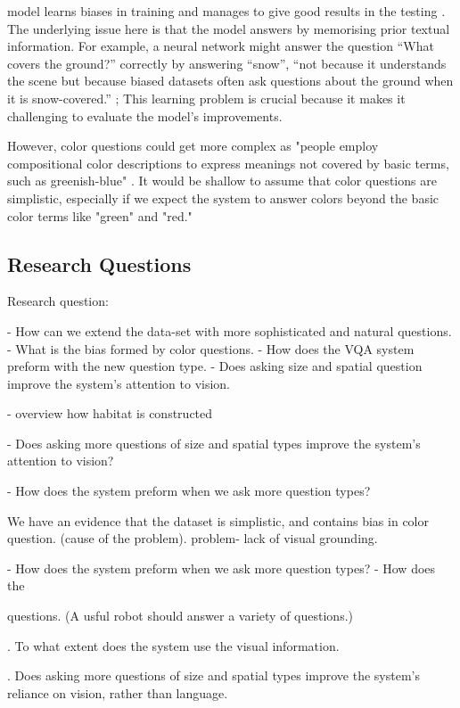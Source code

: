 model learns biases in training and manages to give good results in the testing \cite{selvaraju2020squinting}. The underlying issue here is that the model answers by memorising prior textual information. For example, a neural network might answer the question “What covers the ground?” correctly by answering “snow”, “not because it understands the scene but because biased datasets often ask questions about the ground when it is snow-covered.” \cite{johnson2017clevr}; This learning problem is crucial because it makes it challenging to evaluate the model’s improvements\cite{agrawal2018don}.


However, color questions could get more complex as "people employ compositional color descriptions to express meanings not covered by basic terms, such as greenish-blue" \cite{monroe2016learning}. It would be shallow to assume that color questions are simplistic, especially if we expect the system to answer colors beyond the basic color terms like "green" and "red." 


\subsection{Research Questions}



Research question: 

- How can we extend the data-set with more sophisticated and natural questions.
- What is the bias formed by color questions. 
- How does the VQA system preform with the new question type. 
- Does asking size and spatial question improve the system's attention to vision.  


- overview how habitat is constructed 

- Does asking more questions of size and spatial types improve the system's attention to vision?

- How does the system preform when we ask more question types?


We have an evidence that the dataset is simplistic, and contains bias in color question. (cause of the problem). problem- lack of visual grounding. 

- How does the system preform when we ask more question types?
- How does the 

questions. (A usful robot should answer a variety of questions.)

. To what extent does the system use  the visual information.

. Does asking more questions of size and spatial types improve the system's reliance on vision, rather than language.

